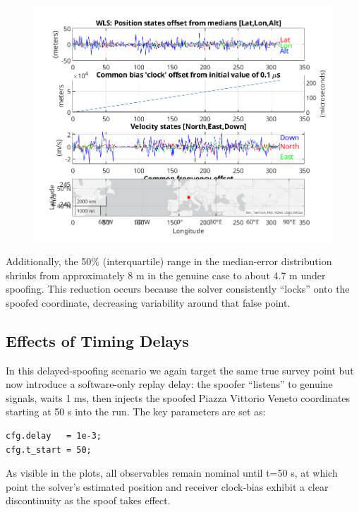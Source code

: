         \begin{figure}[h!]
            \centering
            \includegraphics[width=0.9\columnwidth]{images/tests/Monte_Cappuccini/Spoofing/Samsung_A51_Monte_Cappuccini_fig5.png}
            \caption{}
        \end{figure}

        
        \noindent Additionally, the 50\% (interquartile) range in the median-error distribution shrinks from approximately 8 m in the genuine case to about 4.7 m under spoofing. 
        This reduction occurs because the solver consistently “locks” onto the spoofed coordinate, decreasing variability around that false point.

    \subsection{Effects of Timing Delays}

        In this delayed-spoofing scenario we again target the same true survey point but now introduce a software-only replay delay: the spoofer “listens” to genuine signals, waits 1 ms, then injects the spoofed Piazza Vittorio Veneto coordinates starting at 50 s into the run. 
        The key parameters are set as:

        \begin{verbatim}
cfg.delay   = 1e-3;
cfg.t_start = 50;
        \end{verbatim}

        \noindent As visible in the plots, all observables remain nominal until t=50 s, at which point the solver's estimated position and receiver clock-bias exhibit a clear discontinuity as the spoof takes effect.

